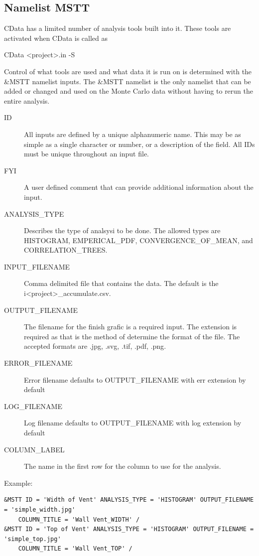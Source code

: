 \documentclass[12pt,twoside]{book}
\begin{document}
\subsection{Namelist MSTT}
\label{info:MSTT}

CData has a limited number of analysis tools built into it. These tools are activated when CData is called as

{\ct CData <project>.in -S}

Control of what tools are used and what data it is run on is determined with the {\ct \&MSTT} namelist inputs. The {\ct \&MSTT} namelist is the only namelist that can be added or changed and used on the Monte Carlo data without having to rerun the entire analysis.


\begin{description}
 \item[ID] All inputs are defined by a unique alphanumeric name. This may be as simple as a single character or number, or a description of the field. All IDs must be unique throughout an input file.
  \item[FYI] A user defined comment that can provide additional information about the input.
 \item[ANALYSIS\_TYPE] Describes the type of analsysi to be done. The allowed types are {\ct HISTOGRAM}, {\ct EMPERICAL\_PDF}, {\ct CONVERGENCE\_OF\_MEAN}, and {\ct CORRELATION\_TREES}.
 \item[INPUT\_FILENAME] Comma delimited file that contains the data. The default is the {\ct i<project>\_accumulate.csv}.
 \item[OUTPUT\_FILENAME] The filename for the finish grafic is a required input. The extension is required as that is the method of determine the format of the file. The accepted formats are {\ct *.jpg}, {\ct *.svg}, {\ct *.tif}, {\ct *.pdf}, {\ct *.png}.
 \item[ERROR\_FILENAME] Error filename defaults to {\ct OUTPUT\_FILENAME} with {\ct err} extension by default
 \item[LOG\_FILENAME] Log filename defaults to {\ct OUTPUT\_FILENAME} with {\ct log} extension by default
 \item[COLUMN\_LABEL] The name in the first row for the column to use for the analysis.
\end{description}

\vspace{\baselineskip}
\noindent Example:
\begin{lstlisting}
&MSTT ID = 'Width of Vent' ANALYSIS_TYPE = 'HISTOGRAM' OUTPUT_FILENAME = 'simple_width.jpg'
	COLUMN_TITLE = 'Wall Vent_WIDTH' /
&MSTT ID = 'Top of Vent' ANALYSIS_TYPE = 'HISTOGRAM' OUTPUT_FILENAME = 'simple_top.jpg'
	COLUMN_TITLE = 'Wall Vent_TOP' /
\end{lstlisting}
\end{document}
